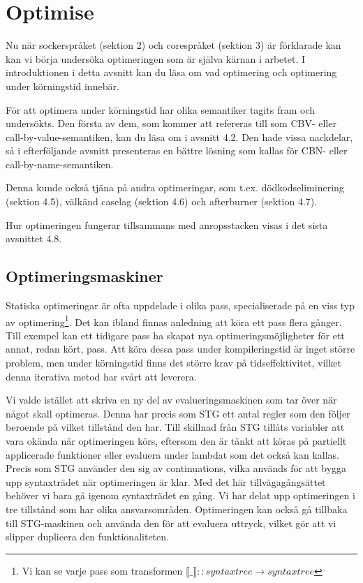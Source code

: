\documentclass[Rapport]{subfiles}
\begin{document}
\section{Optimise}
\label{sec:Optimise}

\overviewOptimise

Nu när sockerspråket (sektion 2) och corespråket (sektion 3) är förklarade
kan kan vi börja undersöka optimeringen som är själva kärnan i arbetet.
I introduktionen i detta avsnitt kan du läsa om vad optimering och 
optimering under körningstid innebär. 

För att optimera under körningstid har olika semantiker tagits fram och undersökts.   
Den första av dem, som kommer att refereras till som CBV- eller call-by-value-semantiken, 
kan du läsa om i avsnitt 4.2. Den hade vissa nackdelar, så i 
efterföljande avsnitt presenteras en bättre lösning som kallas för CBN- eller call-by-name-semantiken.

Denna kunde också tjäna på andra optimeringar, som t.ex.
dödkodseliminering (sektion 4.5), 
välkänd caselag (sektion 4.6) och 
afterburner (sektion 4.7).

Hur optimeringen fungerar tillsammans med anropsstacken visas i det sista avsnittet 4.8.



\subsection{Optimeringsmaskiner}

Statiska optimeringar är ofta uppdelade i olika pass, specialiserade på en viss
typ av optimering\footnote{Vi kan se varje pass som transformen $\llbracket \_ \rrbracket :: syntaxtree \rightarrow syntaxtree$}. Det kan ibland finnas anledning att köra ett pass flera gånger. Till exempel 
kan ett tidigare pass ha skapat nya optimeringsmöjligheter för ett annat, redan kört, pass. 
Att köra dessa pass under kompileringstid är inget större problem, 
men under körningstid finns det större krav på tidseffektivitet, vilket denna iterativa 
metod har svårt att leverera.

Vi valde istället att skriva en ny del av evalueringsmaskinen som tar över när något skall optimeras.
Denna har precis som STG ett antal regler som den följer beroende på vilket
tillstånd den har. Till skillnad från STG tillåts variabler att vara okända när optimeringen
körs, eftersom den är tänkt att köras på partiellt applicerade funktioner eller 
evaluera under lambdat som det också kan kallas.
Precis som STG använder den sig av continuations, vilka används för att bygga upp 
syntaxträdet när optimeringen är klar. Med det här tillvägagångsättet behöver vi 
bara gå igenom syntaxträdet en gång. Vi har delat upp optimeringen i tre tillstånd
som har olika ansvarsområden. Optimeringen kan också gå tillbaka till STG-maskinen
och använda den för att evaluera uttryck, vilket gör att vi slipper duplicera
den funktionaliteten.
\end{document}
